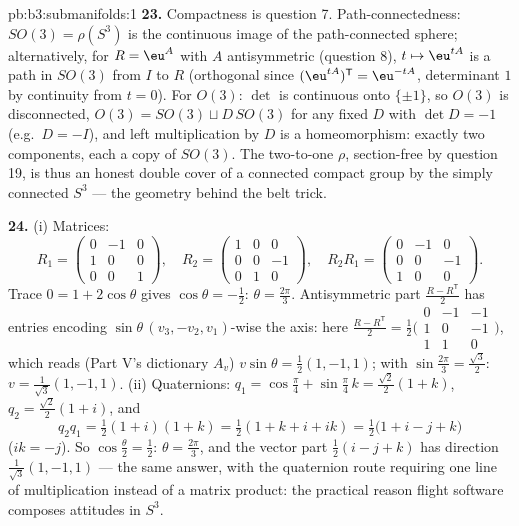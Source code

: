 \begin{solution}{pb:b3:submanifolds:1}
\textbf{23.} Compactness is question 7. Path-connectedness:
$SO(3) = \rho(S^3)$ is the continuous image of the
path-connected sphere; alternatively, for $R = \eu^{A}$
with $A$ antisymmetric (question 8), $t \mapsto \eu^{tA}$
is a path in $SO(3)$ from $I$ to $R$ (orthogonal since
$(\eu^{tA})^{\mathsf T} = \eu^{-tA}$, determinant $1$ by
continuity from $t = 0$). For $O(3)$: $\det$ is continuous
onto $\{\pm1\}$, so $O(3)$ is disconnected, $O(3) = SO(3)
\sqcup D\,SO(3)$ for any fixed $D$ with $\det D = -1$
(e.g.\ $D = -I$), and left multiplication by $D$ is a
homeomorphism: exactly two components, each a copy of
$SO(3)$. The two-to-one $\rho$, section-free by question
19, is thus an honest double cover of a connected compact
group by the simply connected $S^3$ --- the geometry behind
the belt trick.

\textbf{24.} (i) Matrices:
\[
R_1 = \begin{pmatrix} 0 & -1 & 0\\ 1 & 0 & 0\\ 0 & 0 & 1
\end{pmatrix},
\quad
R_2 = \begin{pmatrix} 1 & 0 & 0\\ 0 & 0 & -1\\ 0 & 1 & 0
\end{pmatrix},
\quad
R_2R_1 = \begin{pmatrix} 0 & -1 & 0\\ 0 & 0 & -1\\ 1 & 0 &
0\end{pmatrix}.
\]
Trace $0 = 1 + 2\cos\theta$ gives $\cos\theta = -\frac12$:
$\theta = \frac{2\pi}3$. Antisymmetric part $\frac{R -
R^{\mathsf T}}2$ has entries encoding $\sin\theta\,(v_3,
-v_2, v_1)$-wise the axis: here $\frac{R - R^{\mathsf T}}2 =
\frac12\bigl(\begin{smallmatrix}0 & -1 & -1\\ 1 & 0 & -1\\ 1
& 1 & 0\end{smallmatrix}\bigr)$, which reads (Part V's
dictionary $A_v$) $v\sin\theta = \frac12(1, -1, 1)$; with
$\sin\frac{2\pi}3 = \frac{\sqrt3}2$: $v = \frac1{\sqrt3}(1,
-1, 1)$.
(ii) Quaternions: $q_1 = \cos\frac\pi4 + \sin\frac\pi4\,k =
\frac{\sqrt2}2(1 + k)$, $q_2 = \frac{\sqrt2}2(1 + i)$, and
\[
q_2q_1 = \tfrac12(1 + i)(1 + k) = \tfrac12(1 + k + i + ik)
= \tfrac12\bigl(1 + i - j + k\bigr)
\]
($ik = -j$). So $\cos\frac\theta2 = \frac12$: $\theta =
\frac{2\pi}3$, and the vector part $\frac12(i - j + k)$ has
direction $\frac1{\sqrt3}(1, -1, 1)$ --- the same answer,
with the quaternion route requiring one line of
multiplication instead of a matrix product: the practical
reason flight software composes attitudes in $S^3$.


\end{solution}
